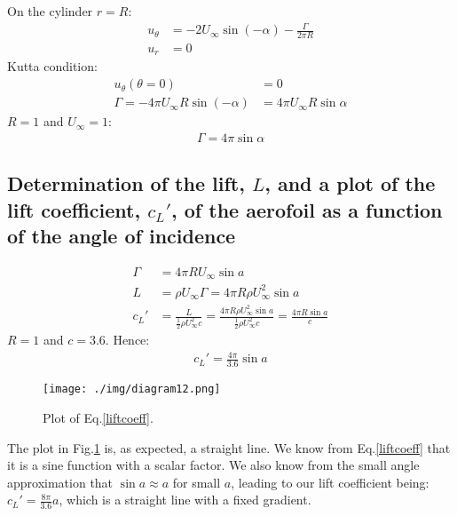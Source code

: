 On the cylinder $r=R$:
\begin{align}
    u_{\theta} & = -2U_{\infty} \sin\left(-\alpha\right) - \frac{\Gamma}{2\pi R} \\
    u_r        & = 0
\end{align}
Kutta condition:
\begin{align}
    u_{\theta} \left(\theta = 0\right)                   & = 0                           \\
    \Gamma = -4\pi U_{\infty} R \sin\left(-\alpha\right) & = 4\pi U_{\infty} R\sin\alpha
\end{align}
$R=1$ and $U_{\infty} =1$:
\begin{align}
    \Gamma = 4\pi \sin\alpha
\end{align}
\subsection{Determination of the lift, $L$, and a plot of the lift coefficient, $c_L'$, of the aerofoil as a function of the angle of incidence}
\begin{align}
    \Gamma & = 4\pi R U_{\infty} \sin a                                                                                                                    \\
    L      & = \rho U_{\infty} \Gamma = 4\pi R \rho U_{\infty}^2 \sin a                                                                                    \\
    c_L'   & = \frac{L}{\frac{1}{2}\rho U_{\infty}^2 c} = \frac{4\pi R \rho U_{\infty}^2 \sin a}{\frac{1}{2}\rho U_{\infty}^2 c} = \frac{4\pi R \sin a}{c}
\end{align}
$R=1$ and $c=3.6$. Hence:
\begin{align}
    c_L' = \frac{4\pi}{3.6}\sin a \label{liftcoeff}
\end{align}
\begin{figure}[H]
    \centering
    \texttt{[image: ./img/diagram12.png]}
    \caption{Plot of Eq.\ref{liftcoeff}.}
    \label{liftcoeffplot}
\end{figure}
The plot in Fig.\ref{liftcoeffplot} is, as expected, a straight line. We know from Eq.\ref{liftcoeff} that it is a sine function with a scalar factor. We also know from the small angle approximation that $\sin a \approx a$ for small $a$, leading to our lift coefficient being: $c_L' = \frac{8\pi}{3.6}a$, which is a straight line with a fixed gradient.

